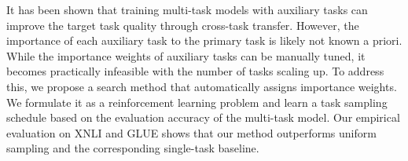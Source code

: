It has been shown that training multi-task models with auxiliary tasks can improve the target task quality through cross-task transfer. However, the importance of each auxiliary task to the primary task is likely not known a priori. While the importance weights of auxiliary tasks can be manually tuned, it becomes practically infeasible with the number of tasks scaling up. To address this, we propose a search method that automatically assigns importance weights. We formulate it as a reinforcement learning problem and learn a task sampling schedule based on the evaluation accuracy of the multi-task model. Our empirical evaluation on XNLI and GLUE shows that our method outperforms uniform sampling and the corresponding single-task baseline.
